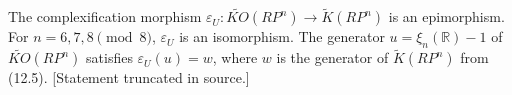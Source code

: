 The complexification morphism $\varepsilon_U: \widetilde{KO}(RP^n) \to \tilde{K}(RP^n)$ is an epimorphism. For $n = 6, 7, 8 \pmod{8}$, $\varepsilon_U$ is an isomorphism. The generator $u = \xi_n(\mathbb{R}) - 1$ of $\widetilde{KO}(RP^n)$ satisfies $\varepsilon_U(u) = w$, where $w$ is the generator of $\tilde{K}(RP^n)$ from (12.5). [Statement truncated in source.]
